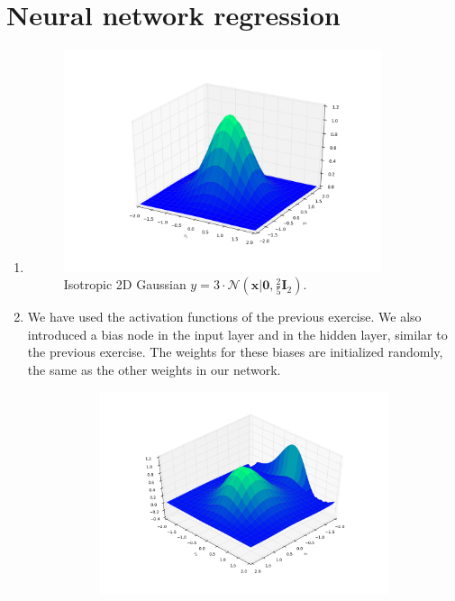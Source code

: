 \documentclass[a4paper,10pt]{article}
\numberwithin{equation}{section} %
\numberwithin{figure}{section} %
\numberwithin{table}{section} %
\theoremstyle{mytheor}
\begin{document}
\section{Neural network regression}
\begin{enumerate}
	\item \begin{figure}[h]
   			\centering
   			\includegraphics[width=0.88\textwidth]{std_iso_gaussian.png}\vspace{-1cm}
   			\caption{\vspace{-0.1cm} Isotropic 2D Gaussian $y = 3 \cdot \mathcal{N}(\boldsymbol{x} \big\vert \boldsymbol{0}, \frac{2}{5} \boldsymbol{I}_2)$.}\vspace{-0.2cm}
  		\end{figure}
	\item We have used the activation functions of the previous exercise. We also introduced a bias node in the input layer and in the hidden layer, similar to the previous exercise. The weights for these biases are initialized randomly, the same as the other weights in our network. 
		\begin{figure}[h!]
			\centering
			\begin{subfigure}[b]{0.45\textwidth}
				\includegraphics[width=\textwidth]{ex2_2.png}\vspace{-0.5cm}

\end{subfigure}
\end{figure}
\end{enumerate}
\end{document}
